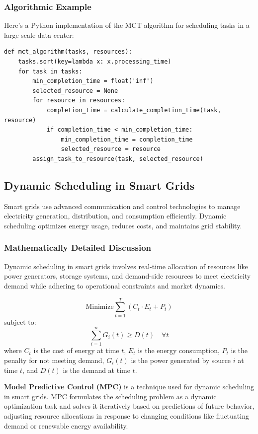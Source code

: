 \documentclass[12pt]{book} %
\begin{document}
\subsubsection{Algorithmic Example}
Here's a Python implementation of the MCT algorithm for scheduling tasks in a large-scale data center:
\FloatBarrier
\begin{lstlisting}
def mct_algorithm(tasks, resources):
    tasks.sort(key=lambda x: x.processing_time)
    for task in tasks:
        min_completion_time = float('inf')
        selected_resource = None
        for resource in resources:
            completion_time = calculate_completion_time(task, resource)
            if completion_time < min_completion_time:
                min_completion_time = completion_time
                selected_resource = resource
        assign_task_to_resource(task, selected_resource)
\end{lstlisting}
\FloatBarrier

\subsection{Dynamic Scheduling in Smart Grids}
Smart grids use advanced communication and control technologies to manage electricity generation, distribution, and consumption efficiently. Dynamic scheduling optimizes energy usage, reduces costs, and maintains grid stability.

\subsubsection{Mathematically Detailed Discussion}
Dynamic scheduling in smart grids involves real-time allocation of resources like power generators, storage systems, and demand-side resources to meet electricity demand while adhering to operational constraints and market dynamics.

\[
\text{Minimize} \sum_{t=1}^{T} (C_t \cdot E_t + P_t)
\]
subject to:
\[
\sum_{i=1}^{n} G_i(t) \geq D(t) \quad \forall t
\]
where \(C_t\) is the cost of energy at time \(t\), \(E_t\) is the energy consumption, \(P_t\) is the penalty for not meeting demand, \(G_i(t)\) is the power generated by source \(i\) at time \(t\), and \(D(t)\) is the demand at time \(t\).

\textbf{Model Predictive Control (MPC)} is a technique used for dynamic scheduling in smart grids. MPC formulates the scheduling problem as a dynamic optimization task and solves it iteratively based on predictions of future behavior, adjusting resource allocations in response to changing conditions like fluctuating demand or renewable energy availability.
\end{document}
